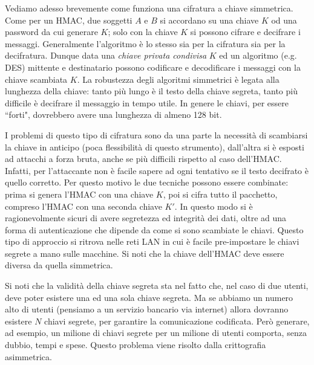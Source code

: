Vediamo adesso brevemente come funziona una cifratura a chiave simmetrica. Come per un HMAC, due soggetti $A$ e $B$ si accordano su una chiave $K$ od una password da cui generare $K$; solo con la chiave $K$ si possono cifrare e decifrare i messaggi. Generalmente l'algoritmo è lo stesso sia per la cifratura sia per la decifratura. Dunque data una \textit{chiave privata condivisa} $K$ ed un algoritmo (e.g. DES) mittente e destinatario possono codificare e decodificare i messaggi con la chiave scambiata $K$. La robustezza degli algoritmi simmetrici è legata alla lunghezza della chiave: tanto più lungo è il testo della chiave segreta, tanto più difficile è decifrare il messaggio in tempo utile. In genere le chiavi, per essere \textquotedblleft forti", dovrebbero avere una lunghezza di almeno 128 bit.

I problemi di questo tipo di cifratura sono da una parte la necessità di scambiarsi la chiave in anticipo (poca flessibilità di questo strumento), dall'altra si è esposti ad attacchi a forza bruta, anche se più difficili rispetto al caso dell'HMAC. Infatti, per l'attaccante non è facile sapere ad ogni tentativo se il testo decifrato è quello corretto. Per questo motivo le due tecniche possono essere combinate: prima si genera l'HMAC con una chiave $K$, poi si cifra tutto il pacchetto, compreso l'HMAC con una seconda chiave $K'$. In questo modo si è ragionevolmente sicuri di avere segretezza ed integrità dei dati, oltre ad una forma di autenticazione che dipende da come si sono scambiate le chiavi. Questo tipo di approccio si ritrova nelle reti LAN in cui è facile pre-impostare le chiavi segrete a mano sulle macchine. Si noti che la chiave dell'HMAC deve essere diversa da quella simmetrica.

Si noti che la validità della chiave segreta sta nel fatto che, nel caso di due utenti, deve poter esistere una ed una sola chiave segreta. Ma se abbiamo un numero alto di utenti (pensiamo a un servizio bancario via internet) allora dovranno esistere $N$ chiavi segrete, per garantire la comunicazione codificata. Però generare, ad esempio, un milione di chiavi segrete per un milione di utenti comporta, senza dubbio, tempi e spese. Questo problema viene risolto dalla crittografia asimmetrica.


